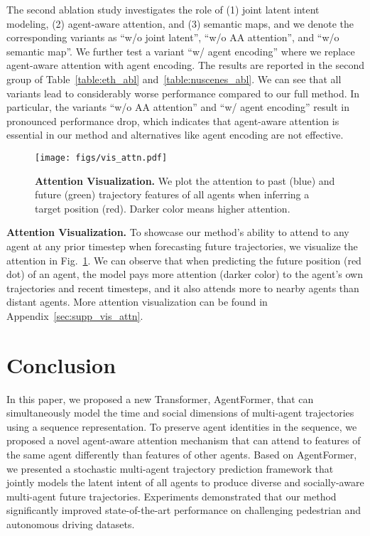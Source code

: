 \documentclass[10pt,twocolumn,letterpaper]{article}
\newcommand{\mname}{AgentFormer}
\begin{document}
The second ablation study investigates the role of (1) joint latent intent modeling, (2) agent-aware attention, and (3) semantic maps, and we denote the corresponding variants as ``w/o joint latent'', ``w/o AA attention'', and ``w/o semantic map''. We further test a variant ``w/ agent encoding'' where we replace agent-aware attention with agent encoding. The results are reported in the second group of Table~\ref{table:eth_abl} and~\ref{table:nuscenes_abl}. We can see that all variants lead to considerably worse performance compared to our full method. In particular, the variants ``w/o AA attention'' and ``w/ agent encoding'' result in pronounced performance drop, which indicates that agent-aware attention is essential in our method and alternatives like agent encoding are not effective.

\begin{figure}
    \centering
    \texttt{[image: figs/vis\_attn.pdf]}
    \caption{\textbf{Attention Visualization.} We plot the attention to past (blue) and future (green) trajectory features of all agents when inferring a target position (red). Darker color means higher attention.}
    \label{fig:vis_attn}
    \vspace{-2mm}
\end{figure}

\vspace{2mm}
\noindent\textbf{Attention Visualization.}
To showcase our method's ability to attend to any agent at any prior timestep when forecasting future trajectories, we visualize the attention in Fig.~\ref{fig:vis_attn}. We can observe that when predicting the future position (red dot) of an agent, the model pays more attention (darker color) to the agent's own trajectories and recent timesteps, and it also attends more to nearby agents than distant agents. More attention visualization can be found in Appendix~\ref{sec:supp_vis_attn}.


\section{Conclusion}
In this paper, we proposed a new Transformer, \mname, that can simultaneously model the time and social dimensions of multi-agent trajectories using a sequence representation. To preserve agent identities in the sequence, we proposed a novel agent-aware attention mechanism that can attend to features of the same agent differently than features of other agents. Based on \mname, we presented a stochastic multi-agent trajectory prediction framework that jointly models the latent intent of all agents to produce diverse and socially-aware multi-agent future trajectories. Experiments demonstrated that our method significantly improved state-of-the-art performance on challenging pedestrian and autonomous driving datasets.
\end{document}
